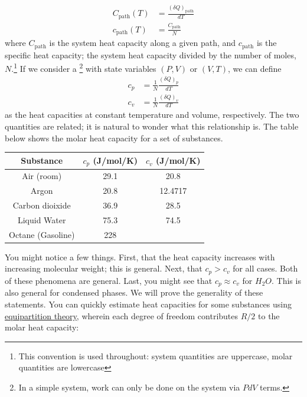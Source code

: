 \documentclass[12pt]{article}
\begin{document}
\begin{align*}
C_\text{path} (T) &= \frac{(\delta Q)_\text{path}}{dT}\\
c_\text{path} (T) &= \frac{C_\text{path}}{N} %
\end{align*}
where $C_\text{path}$ is the system heat capacity along a given path, and $c_\text{path}$ is the specific heat capacity; the system heat capacity divided by the number of moles, $N$.\footnote{This convention is used throughout: system quantities are uppercase, molar quantities are lowercase}   If we consider a \footnote{In a simple system, work can only be done on the system via $PdV$ terms.} with state variables $(P,V)$ or $(V,T)$, we can define
\begin{align*}
c_p &= \frac{1}{N} \frac{(\delta Q)_p}{dT}\\
c_v &=  \frac{1}{N} \frac{(\delta Q)_v}{dT}
\end{align*}
as the heat capacities at constant temperature and volume, respectively. The two quantities are related; it is natural to wonder what this relationship is. %
The table below shows the molar heat capacity for a set of substances.
\begin{center}
\begin{tabular}{ c|c|c } 
 Substance & $c_p$ (J/mol/K)& $c_v$ (J/mol/K) \\ 
 \hline
 Air (room) & 29.1 & 20.8 \\ 
 Argon & 20.8 & 12.4717 \\ 
 Carbon dioixide & 36.9 & 28.5\\
 Liquid Water & 75.3 & 74.5\\
 Octane (Gasoline) & 228 &  \\
\end{tabular}
\end{center}

You might notice a few things. First, that the heat capacity increases with increasing molecular weight; this is general. Next, that $c_p > c_v$ for all cases. Both of these phenomena are general. Last, you might see that $c_p \approx c_v$ for $H_2O$. This is also general for condensed phases. We will prove the generality of these statements. %
You can quickly estimate heat capacities for some substances using \href{http://en.wikipedia.org/wiki/Equipartition_theorem}{equipartition theory}, wherein each degree of freedom contributes $R/2$ to the molar heat capacity:
\end{document}
